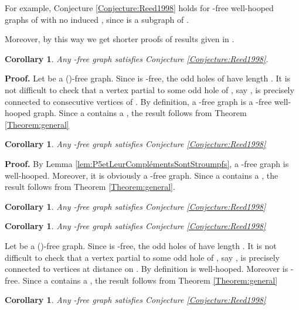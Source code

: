 \documentclass{amsart}
\newtheorem{cor}[thm]{Corollary}
\theoremstyle{definition}
\theoremstyle{remark}
\newenvironment{prf}{{\bf \noindent Proof. } }{\hfill\\}
\newcommand{\wh}{well-hooped\xspace}
\begin{document}
For example, Conjecture \ref{Conjecture:Reed1998} holds for -free \wh graphs of  with no induced , since  is a subgraph of .

Moreover, by this way we get shorter proofs of results given in \cite{AraKarSub2011}.

\begin{cor} \cite{AraKarSub2011} Any -free graph satisfies Conjecture \ref{Conjecture:Reed1998}.
\end{cor}
\begin{prf} Let  be a ()-free graph. Since  is -free, the odd holes of  have length . It is not difficult to check that a vertex partial to some odd hole of , say , 
is precisely connected to  consecutive vertices of .
 By definition, a -free graph is  a 
-free \wh graph. Since a   contains a , the result follows from Theorem \ref{Theorem:general}
\end{prf}

\begin{cor}  Any -free graph satisfies Conjecture \ref{Conjecture:Reed1998}
\end{cor}
\begin{prf} By Lemma \ref{lem:P5etLeurComplémentsSontStroumpfs}, a  -free graph is \wh. 
Moreover, it is obviously a -free graph. Since a   contains a , the result follows from Theorem \ref{Theorem:general}.
\end{prf}

\begin{cor} \cite{AraKarSub2011} Any -free graph satisfies Conjecture \ref{Conjecture:Reed1998}
\end{cor}



\begin{cor}  Any -free graph satisfies Conjecture \ref{Conjecture:Reed1998}
\end{cor}

\begin{prf} 
Let  be a ()-free graph. Since  is -free, the odd holes of  have length . It is not difficult to check that a vertex partial to some odd hole of , say , 
is precisely connected to  vertices at distance  on .
By definition  is  \wh. Moreover  is -free. Since a   contains a , 
the result follows from Theorem \ref{Theorem:general}
\end{prf}

\begin{cor}  \cite{AraKarSub2011} Any -free graph satisfies Conjecture \ref{Conjecture:Reed1998}
\end{cor}
\end{document}
